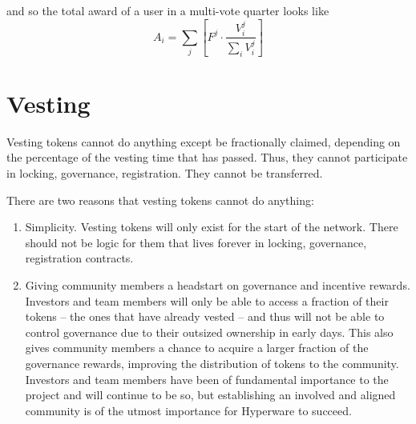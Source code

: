 \documentclass{article}
\begin{document}
and so the total award of a user in a multi-vote quarter looks like
\begin{equation}
A_i = \sum_j \left[F^{j} \cdot \frac{V^{j}_i}{\sum_i V^{j}_i}\right]
\end{equation}

\section{Vesting}

Vesting tokens cannot do anything except be fractionally claimed, depending on the percentage of the vesting time that has passed.
Thus, they cannot participate in locking, governance, registration.
They cannot be transferred.

There are two reasons that vesting tokens cannot do anything:
\begin{enumerate}
    \item Simplicity.
       Vesting tokens will only exist for the start of the network.
       There should not be logic for them that lives forever in locking, governance, registration contracts.
    \item Giving community members a headstart on governance and incentive rewards.
       Investors and team members will only be able to access a fraction of their tokens -- the ones that have already vested -- and thus will not be able to control governance due to their outsized ownership in early days.
       This also gives community members a chance to acquire a larger fraction of the governance rewards, improving the distribution of tokens to the community.
       Investors and team members have been of fundamental importance to the project and will continue to be so, but establishing an involved and aligned community is of the utmost importance for Hyperware to succeed.
\end{enumerate}
\end{document}
